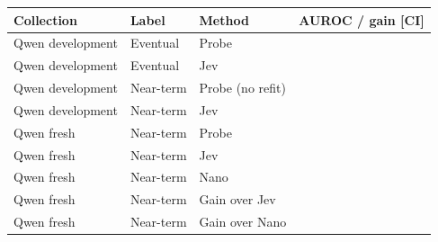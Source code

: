 \begin{tabular}{llll}
\toprule
Collection & Label & Method & AUROC / gain [CI] \\
\midrule
Qwen development & Eventual & Probe & \qwenOriginalEventualProbe{} \qwenOriginalEventualProbeCI{} \\
Qwen development & Eventual & Jev & \qwenOriginalEventualJev{} \qwenOriginalEventualJevCI{} \\
Qwen development & Near-term & Probe (no refit) & \qwenOriginalNeartermProbe{} \qwenOriginalNeartermProbeCI{} \\
Qwen development & Near-term & Jev & \qwenOriginalNeartermJev{} \qwenOriginalNeartermJevCI{} \\
Qwen fresh & Near-term & Probe & \qwenRoundFreshProbe{} \qwenRoundFreshProbeCI{} \\
Qwen fresh & Near-term & Jev & \qwenRoundFreshJev{} \qwenRoundFreshJevCI{} \\
Qwen fresh & Near-term & Nano & \qwenRoundFreshNano{} \qwenRoundFreshNanoCI{} \\
Qwen fresh & Near-term & Gain over Jev & \qwenRoundFreshGainJev{} \qwenRoundFreshGainJevCI{} \\
Qwen fresh & Near-term & Gain over Nano & \qwenRoundFreshGainNano{} \qwenRoundFreshGainNanoCI{} \\
\bottomrule
\end{tabular}
